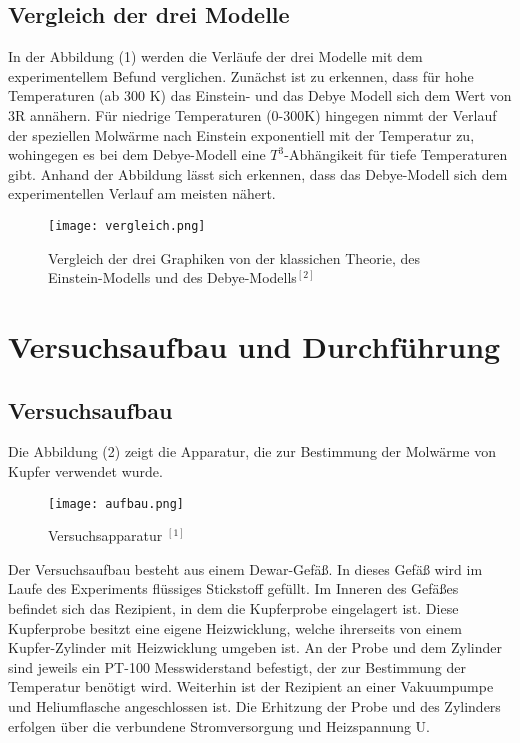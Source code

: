 \documentclass{article}
\begin{document}
\subsection{Vergleich der drei Modelle}
In der Abbildung (1) werden die Verläufe der drei Modelle mit dem experimentellem Befund verglichen. Zunächst ist zu erkennen, dass für hohe Temperaturen (ab 300 K) das Einstein- und das Debye Modell sich dem Wert von 3R annähern. Für niedrige Temperaturen (0-300K) hingegen nimmt der Verlauf der speziellen Molwärme nach Einstein exponentiell mit der Temperatur zu, wohingegen es bei dem Debye-Modell eine $T^3$-Abhängikeit für tiefe Temperaturen gibt. Anhand der Abbildung lässt sich erkennen, dass das Debye-Modell sich dem experimentellen Verlauf am meisten nähert. 
\begin{figure}[H]
	\centering
	\texttt{[image: vergleich.png]}
	\caption{  Vergleich der drei Graphiken von der klassichen Theorie, des Einstein-Modells und des Debye-Modells$^{[2]}$}   
	\label{fig: abb. 1}
\end{figure} 
\section{Versuchsaufbau und Durchführung}
\subsection{Versuchsaufbau}
Die Abbildung (2) zeigt die Apparatur, die zur Bestimmung der Molwärme von Kupfer verwendet wurde. 

\begin{figure}[H]
	\centering
	\texttt{[image: aufbau.png]}
	\caption{ Versuchsapparatur $^{[1]}$}   
	\label{fig: abb. 1}
\end{figure}
Der Versuchsaufbau besteht aus einem Dewar-Gefäß. In dieses Gefäß wird im Laufe des Experiments flüssiges Stickstoff gefüllt. Im Inneren des Gefäßes befindet sich das Rezipient, in dem die Kupferprobe eingelagert ist. Diese Kupferprobe besitzt eine eigene Heizwicklung, welche ihrerseits von einem Kupfer-Zylinder mit Heizwicklung umgeben ist. An der Probe und dem Zylinder sind jeweils ein PT-100 Messwiderstand befestigt, der zur Bestimmung der Temperatur benötigt wird. Weiterhin ist der Rezipient an einer Vakuumpumpe und Heliumflasche angeschlossen ist. Die Erhitzung der Probe und des Zylinders erfolgen über die verbundene Stromversorgung und Heizspannung U. 
\end{document}
